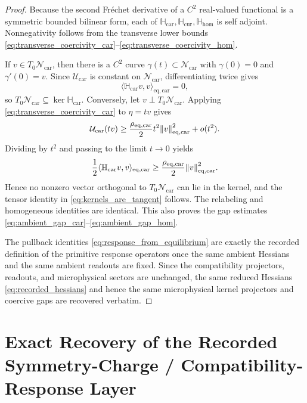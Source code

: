 \documentclass[11pt]{article}
\newcommand{\TensorAmbientHess}{\mathbb H_{\mathrm{car}}}
\newcommand{\CurAmbientHess}{\mathbb H_{\mathrm{cur}}}
\newcommand{\HomAmbientHess}{\mathbb H_{\mathrm{hom}}}
\newcommand{\EqCarGap}{\rho_{\mathrm{eq,car}}}
\newcommand{\TensorAmbientEnergy}{\mathcal U_{\mathrm{car}}}
\newcommand{\TensorEqManifold}{\mathcal N_{\mathrm{car}}}
\begin{document}
\begin{proof}
Because the second Fr\'echet derivative of a \(C^2\) real-valued functional is a symmetric bounded bilinear form, each of \(\TensorAmbientHess,\CurAmbientHess,\HomAmbientHess\) is self adjoint. Nonnegativity follows from the transverse lower bounds \eqref{eq:transverse_coercivity_car}--\eqref{eq:transverse_coercivity_hom}.

If \(v\in T_0\TensorEqManifold\), then there is a \(C^2\) curve \(\gamma(t)\subset\TensorEqManifold\) with \(\gamma(0)=0\) and \(\gamma'(0)=v\). Since \(\TensorAmbientEnergy\) is constant on \(\TensorEqManifold\), differentiating twice gives
\[
\langle \TensorAmbientHess v,v\rangle_{\mathrm{eq,car}}=0,
\]
so \(T_0\TensorEqManifold\subseteq\ker\TensorAmbientHess\). Conversely, let \(v\perp T_0\TensorEqManifold\). Applying \eqref{eq:transverse_coercivity_car} to \(\eta=tv\) gives
\[
\TensorAmbientEnergy(tv)
\ge
\frac{\EqCarGap}{2}t^2\norm{v}_{\mathrm{eq,car}}^2+o(t^2).
\]
Dividing by \(t^2\) and passing to the limit \(t\to0\) yields
\[
\frac12\langle \TensorAmbientHess v,v\rangle_{\mathrm{eq,car}}
\ge
\frac{\EqCarGap}{2}\norm{v}_{\mathrm{eq,car}}^2.
\]
Hence no nonzero vector orthogonal to \(T_0\TensorEqManifold\) can lie in the kernel, and the tensor identity in \eqref{eq:kernels_are_tangent} follows. The relabeling and homogeneous identities are identical. This also proves the gap estimates \eqref{eq:ambient_gap_car}--\eqref{eq:ambient_gap_hom}.

The pullback identities \eqref{eq:response_from_equilibrium} are exactly the recorded definition of the primitive response operators once the same ambient Hessians and the same ambient readouts are fixed. Since the compatibility projectors, readouts, and microphysical sectors are unchanged, the same reduced Hessians \eqref{eq:recorded_hessians} and hence the same microphysical kernel projectors and coercive gaps are recovered verbatim.
\end{proof}

\section{Exact Recovery of the Recorded Symmetry-Charge / Compatibility-Response Layer}
\end{document}
